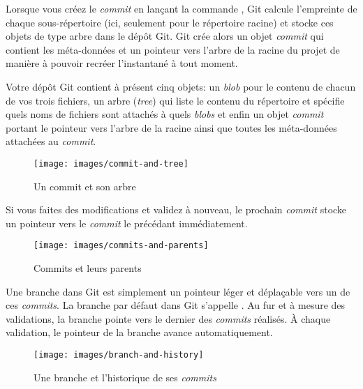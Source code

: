 Lorsque vous créez le \emph{commit} en lançant la commande , Git calcule l'empreinte de chaque sous-répertoire (ici, seulement pour le répertoire racine) et stocke ces objets de type arbre dans le dépôt Git.
Git crée alors un objet \emph{commit} qui contient les méta-données et un pointeur vers l'arbre de la racine du projet de manière à pouvoir recréer l'instantané à tout moment.

Votre dépôt Git contient à présent cinq objets:
un \emph{blob} pour le contenu de chacun de vos trois fichiers, un arbre (\emph{tree}) qui liste le contenu du répertoire et spécifie quels noms de fichiers sont attachés à quels \emph{blobs} et enfin un objet \emph{commit} portant le pointeur vers l'arbre de la racine ainsi que toutes les méta-données attachées au \emph{commit}.

\begin{figure}[H]
  \centering
  \texttt{[image: images/commit-and-tree]}
  \caption{Un commit et son arbre}
  \label{fig:git:commit-and-tree}
\end{figure}

Si vous faites des modifications et validez à nouveau, le prochain \emph{commit} stocke un pointeur vers le \emph{commit} le précédant immédiatement.

\begin{figure}[H]
  \centering
  \texttt{[image: images/commits-and-parents]}
  \caption{Commits et leurs parents}
  \label{fig:git:commits-and-parents}
\end{figure}

Une branche dans Git est simplement un pointeur léger et déplaçable vers un de ces \emph{commits}.
La branche par défaut dans Git s'appelle .
Au fur et à mesure des validations, la branche  pointe vers le dernier des \emph{commits} réalisés.
À chaque validation, le pointeur de la branche  avance automatiquement.


\begin{figure}[H]
  \centering
  \texttt{[image: images/branch-and-history]}
  \caption{Une branche et l'historique de ses \emph{commits}}
  \label{fig:git:branch-and-history}
\end{figure}

